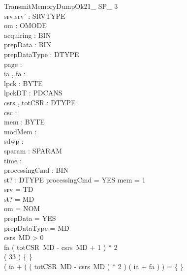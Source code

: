 \begin{schema}{TransmitMemoryDumpOk21\_ SP\_ 3}\\
 srv,srv' : SRVTYPE \\
 om : OMODE \\
 acquiring : BIN \\
 prepData : BIN \\
 prepDataType : DTYPE \\
 page : \nat \\
 ia , fa : \nat \\
 lpck : \seq BYTE \\
 lpckDT : PDCANS \\
 csrs , totCSR : DTYPE \fun \nat \\
 csc : \nat \\
 mem : \nat \pfun BYTE \\
 modMem : \power \nat \\
 sdwp : \nat \\
 sparam : SPARAM \fun \nat \\
 time : \nat \\
 processingCmd : BIN \\
 st? : DTYPE 
\where
 processingCmd = YES \land \dom mem = 1  \\
 srv = TD \\
 st? = MD \\
 om = NOM \\
 prepData = YES \\
 prepDataType = MD \\
 csrs~MD > 0 \\
 fa \leq ( totCSR~MD - csrs~MD + 1 ) * 2 \\
 ( 33  ) \neq \{ \} \\
 ( ia + ( ( totCSR~MD - csrs~MD ) * 2 ) \upto ( ia + fa ) ) = \{ \}
\end{schema}

